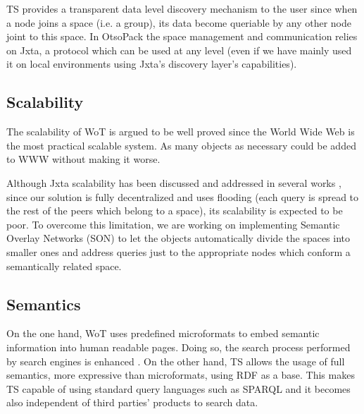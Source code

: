 TS provides a transparent data level discovery mechanism to the user since when a node joins a space (i.e. a group), its data become queriable by any other
node joint to this space. In OtsoPack the space management and communication relies on Jxta, a protocol which can be used at any level (even if we
have mainly used it on local environments using Jxta's discovery layer's capabilities).

\subsection{Scalability}
The scalability of WoT is argued to be well proved since the World Wide Web is the most practical scalable system. As many objects as
necessary could be added to WWW without making it worse. 

Although Jxta scalability has been discussed and addressed in several works \cite{antoniu_performance_2007}, since our solution is fully decentralized
and uses flooding (each query is spread to the rest of the peers which belong to a space), its scalability is expected to be poor. To overcome this limitation,
we are working on implementing Semantic Overlay Networks (SON) to let the objects automatically divide the spaces into smaller ones and address queries
just to the appropriate nodes which conform a semantically related space.

% 

\subsection{Semantics}
On the one hand, WoT uses predefined microformats to embed semantic information into human readable pages. Doing so, the search process performed
by search engines is enhanced \cite{guinard_internet_2011}. On the other hand, TS allows the usage of full semantics, more expressive than microformats,
using RDF as a base. This makes TS capable of using standard query languages such as SPARQL and it becomes also independent of third parties' products to search data.



